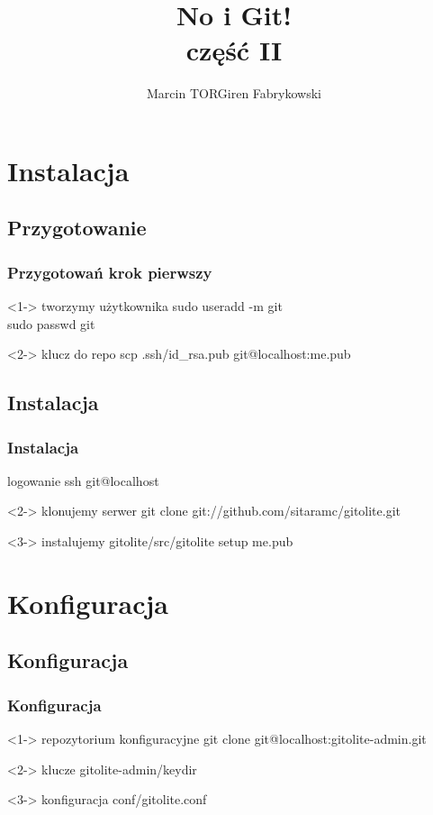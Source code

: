 \documentclass[10pt]{beamer}
\author{Marcin TORGiren Fabrykowski}
\title{No i Git!\\część II}
\institute{AGH - University of Science and Technology}
\begin{document}
\begin{frame}
	\titlepage
\end{frame}
\section{Instalacja}
\subsection{Przygotowanie}
\begin{frame}
	\frametitle{Przygotowań krok pierwszy}
	\begin{block}<1->
	{tworzymy użytkownika}
	sudo useradd -m git\\
	sudo passwd git
	\end{block}
	\begin{block}<2->
	{klucz do repo}	
	scp .ssh/id\_rsa.pub git@localhost:me.pub
	\end{block}
\end{frame}
\subsection{Instalacja}
\begin{frame}
	\frametitle{Instalacja}
	\begin{block}
	{logowanie}
	ssh git@localhost
	\end{block}
	\begin{block}<2->
	{klonujemy serwer}
	git clone git://github.com/sitaramc/gitolite.git
	\end{block}
	\begin{block}<3->
	{instalujemy}
	gitolite/src/gitolite setup me.pub
	\end{block}
\end{frame}
\section{Konfiguracja}
\subsection{Konfiguracja}
\begin{frame}
	\frametitle{Konfiguracja}	
	\begin{block}<1->
	{repozytorium konfiguracyjne}
	git clone git@localhost:gitolite-admin.git
	\end{block}
	\begin{block}<2->
	{klucze}
	gitolite-admin/keydir
	\end{block}
	\begin{block}<3->
	{konfiguracja}
	conf/gitolite.conf
	\end{block}
\end{frame}
\end{document}
